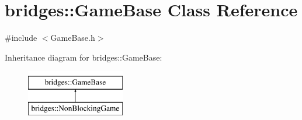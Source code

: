 \hypertarget{classbridges_1_1_game_base}{}\section{bridges\+:\+:Game\+Base Class Reference}
\label{classbridges_1_1_game_base}


{\ttfamily \#include $<$Game\+Base.\+h$>$}

Inheritance diagram for bridges\+:\+:Game\+Base\+:\begin{figure}[H]
\begin{center}
\leavevmode
\includegraphics[height=2.000000cm]{classbridges_1_1_game_base}
\end{center}
\end{figure}

